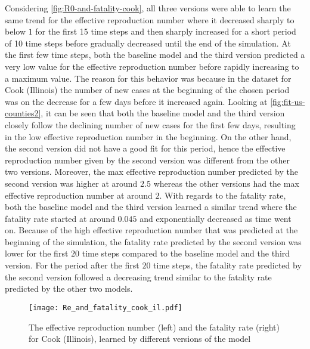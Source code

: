 Considering \autoref{fig:R0-and-fatality-cook}, all three versions were able to learn the same trend for the effective reproduction number where it decreased sharply to below $1$ for the first 15 time steps and then sharply increased for a short period of 10 time steps before gradually decreased until the end of the simulation.
At the first few time steps, both the baseline model and the third version predicted a very low value for the effective reproduction number before rapidly increasing to a maximum value.
The reason for this behavior was because in the dataset for Cook (Illinois) the number of new cases at the beginning of the chosen period was on the decrease for a few days before it increased again.
Looking at \autoref{fig:fit-us-counties2}, it can be seen that both the baseline model and the third version closely follow the declining number of new cases for the first few days, resulting in the low effective reproduction number in the beginning.
On the other hand, the second version did not have a good fit for this period, hence the effective reproduction number given by the second version was different from the other two versions.
Moreover, the max effective reproduction number predicted by the second version was higher at around $2.5$ whereas the other versions had the max effective reproduction number at around $2$.
With regards to the fatality rate, both the baseline model and the third version learned a similar trend where the fatality rate started at around $0.045$ and exponentially decreased as time went on.
Because of the high effective reproduction number that was predicted at the beginning of the simulation, the fatality rate predicted by the second version was lower for the first $20$ time steps compared to the baseline model and the third version.
For the period after the first $20$ time steps, the fatality rate predicted by the second version followed a decreasing trend similar to the fatality rate predicted by the other two models.

\begin{figure}[!htb]
    \centering
    \texttt{[image: Re\_and\_fatality\_cook\_il.pdf]}
    \caption{The effective reproduction number (left) and the fatality rate (right) for Cook (Illinois), learned by different versions of the model}
    \label{fig:R0-and-fatality-cook}
\end{figure}

